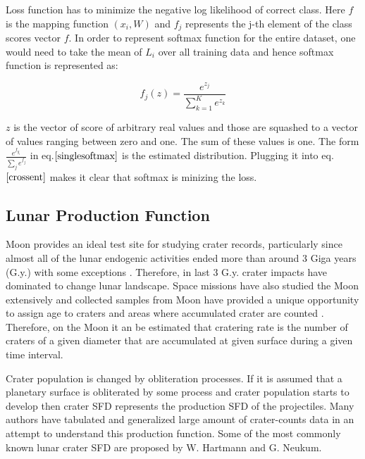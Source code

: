 \documentclass[11pt]{article}
\begin{document}
Loss function has to minimize the negative log likelihood of correct class. Here $f$ is the mapping function $(x_i,W)$ and $f_j$ represents the j-th element of the class scores vector $f$. In order to represent softmax function for the entire dataset, one would need to take the mean of $L_i$ over all training data and hence softmax function is represented as:

\begin{equation}
f_j(z) = \frac{e^{z_j}}{\sum_{k=1}^{K} e^{z_k}}
\end{equation}

$z$ is the vector of score of arbitrary real values and those are squashed to a vector of values ranging between zero and one. The sum of these values is one. The form $\frac{e^{f_{y_i}}}{ \sum_j e^{f_j} }$ in eq.$\ref{singlesoftmax}$ is the estimated distribution. Plugging it into eq.$\ref{crossent}$ makes it clear that softmax is minizing the loss.



\subsection{Lunar Production Function}
Moon provides an ideal test site for studying crater records, particularly since almost all of the lunar endogenic activities ended more than around 3 Giga years (G.y.) with some exceptions \cite{hiesinger2000ages}. Therefore, in last 3 G.y. crater impacts have dominated to change lunar landscape. Space missions have also studied the Moon extensively and collected samples from Moon have provided a unique opportunity to assign age to craters and areas where accumulated crater are counted \cite{stoffler2001stratigraphy}. Therefore, on the Moon it an be estimated that cratering rate is the number of craters of a given diameter that are accumulated at given surface during a given time interval.

Crater population is changed by obliteration processes. If it is assumed that a planetary surface is obliterated by some process and crater population starts to develop then crater SFD represents the production SFD of the projectiles. Many authors have tabulated and generalized large amount of crater-counts data in an attempt to understand this production function. Some of the most commonly known lunar crater SFD are proposed by W. Hartmann and G. Neukum. 
\end{document}
